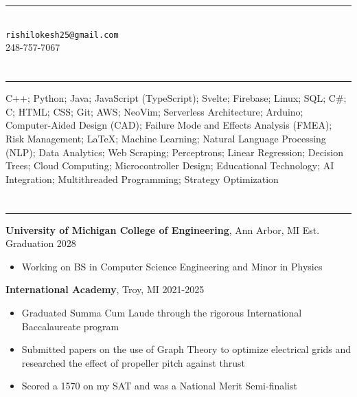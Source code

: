 \documentclass{article}[11pt]
\newcommand{\underlinedsection}[1]{ \section*{\sc{#1}}
	\rule{\textwidth}{1pt} }
\newenvironment{denseitemize} %
{ \begin{itemize}[leftmargin = 20pt, topsep = 0pt, itemsep = 0pt] }
{\end{itemize} }
\newcommand{\education}[3]{ {\textbf{#1}, {#2} \hfill {#3}} }
\begin{document}
\normalsize
\singlespacing

\section*{\centering {}} 
\begin{center}
\rule{3in}{1pt} \\
\texttt{rishilokesh25@gmail.com} \\
248-757-7067 
\end{center} 

\underlinedsection{Skills}
C++; Python; Java; JavaScript (TypeScript); Svelte; Firebase; Linux; SQL; C#; C; HTML; CSS; Git; AWS; NeoVim; Serverless Architecture; Arduino; Computer-Aided Design (CAD); Failure Mode and Effects Analysis (FMEA); Risk Management; LaTeX; Machine Learning; Natural Language Processing (NLP); Data Analytics; Web Scraping; Perceptrons; Linear Regression; Decision Trees; Cloud Computing; Microcontroller Design; Educational Technology; AI Integration; Multithreaded Programming; Strategy Optimization

\underlinedsection{Education}
\education{University of Michigan College of Engineering}{Ann Arbor, MI}{Est. Graduation 2028}

\begin{denseitemize}
	\item Working on BS in Computer Science Engineering and Minor in Physics 
\end{denseitemize}
\education{International Academy}{Troy, MI}{2021-2025}
\begin{denseitemize}
	\item Graduated Summa Cum Laude through the rigorous International Baccalaureate program 
        \item Submitted papers on the use of Graph Theory to optimize electrical grids and researched the effect of propeller pitch against thrust
        \item Scored a 1570 on my SAT and was a National Merit Semi-finalist

\end{denseitemize}
\end{document}
